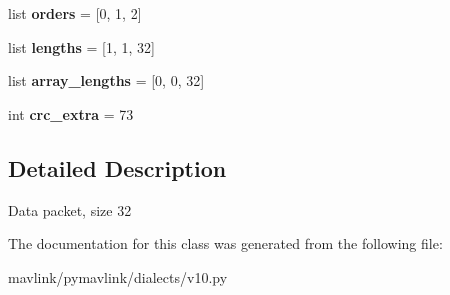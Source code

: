 \begin{DoxyCompactItemize}
\mbox{\label{classpymavlink_1_1dialects_1_1v10_1_1MAVLink__data32__message_ad85c7d2694abeea9bba89ff1d86f94ff}} 
list {\bfseries orders} = \mbox{[}0, 1, 2\mbox{]}
\item 
\mbox{\label{classpymavlink_1_1dialects_1_1v10_1_1MAVLink__data32__message_a8a582c2a0e8708c4d9ac94b096b76d83}} 
list {\bfseries lengths} = \mbox{[}1, 1, 32\mbox{]}
\item 
\mbox{\label{classpymavlink_1_1dialects_1_1v10_1_1MAVLink__data32__message_a7842fdfc51f079a76cbd2a87762d62f2}} 
list {\bfseries array\+\_\+lengths} = \mbox{[}0, 0, 32\mbox{]}
\item 
\mbox{\label{classpymavlink_1_1dialects_1_1v10_1_1MAVLink__data32__message_a6809ad6a88568e6aa53d60905a3c4fe1}} 
int {\bfseries crc\+\_\+extra} = 73
\end{DoxyCompactItemize}


\subsection{Detailed Description}
\begin{DoxyVerb}Data packet, size 32
\end{DoxyVerb}
 

The documentation for this class was generated from the following file\+:\begin{DoxyCompactItemize}
\item 
mavlink/pymavlink/dialects/v10.\+py\end{DoxyCompactItemize}
